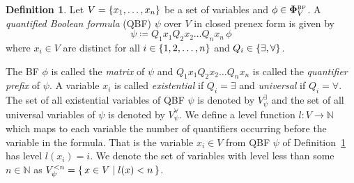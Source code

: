 \documentclass[
  digital, %
  twoside, %
  table,   %
  nolof,     %
  nolot,     %
]{fithesis3}
\let\setbuilder\set
\newcommand{\simpleset}[1]{\{{#1}\}}
\renewcommand{\set}[1]{\normalexpandarg\IfSubStr{#1}{|}{\setbuilder{#1}}{\simpleset{#1}}}
\theoremstyle{definition}
\newtheorem{definition}{Definition}
\theoremstyle{remark}
\newcommand{\BF}[1]{\mathbf{\Phi}_{#1}^{\normalfont{\text{\tiny BF}}}}
\newcommand{\evars}[1]{V_{#1}^{\exists}}
\newcommand{\uvars}[1]{V_{#1}^{\forall}}
\newcommand{\itholds}{\,}
\begin{document}
\begin{definition}
Let $V = \set{x_1,\dots,x_n}$ be a set of variables and $\phi \in \BF{V}$. A \emph{quantified Boolean formula} (QBF) $\psi$ over $V$ in closed prenex form is given by
\[\psi \coloneqq Q_1 x_1 Q_2 x_2 \dots Q_n x_n \itholds \phi\]
where $x_i \in V$ are distinct for all $i \in \set{1,2,\dots,n}$ and $Q_i \in \set{{\exists}, {\forall}}$.
\label{def:QBF}
\end{definition}

The BF $\phi$ is called the \emph{matrix} of $\psi$ and $Q_1 x_1 Q_2 x_2 \dots Q_n x_n$ is called the \emph{quantifier prefix} of $\psi$. A variable $x_i$ is called \emph{existential} if $Q_i = \exists$ and \emph{universal} if $Q_i = \forall$. The set of all existential variables of QBF $\psi$ is denoted by $\evars{\psi}$ and the set of all universal variables of $\psi$ is denoted by $\uvars{\psi}$. We define a level function $l\colon V \to \mathbb{N}$ which maps to each variable the number of quantifiers occurring before the variable in the formula. That is the variable $x_i \in V$ from QBF $\psi$ of Definition~\ref{def:QBF} has level $l(x_i) = i$. We denote the set of variables with level less than some $n \in \mathbb{N}$ as $V_{\psi}^{<n} = \set{x \in V | l(x) < n}$.
\end{document}
